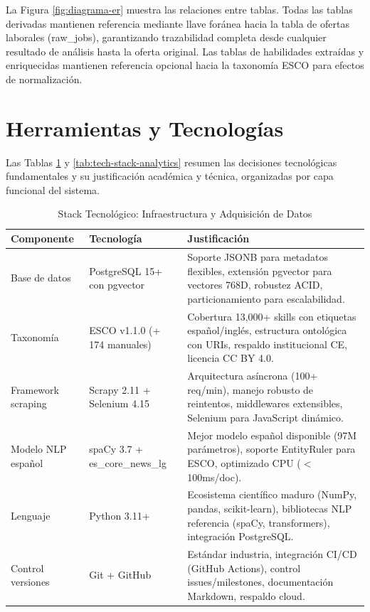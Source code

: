 La Figura \ref{fig:diagrama-er} muestra las relaciones entre tablas. Todas las tablas derivadas mantienen referencia mediante llave foránea hacia la tabla de ofertas laborales (raw\_jobs), garantizando trazabilidad completa desde cualquier resultado de análisis hasta la oferta original. Las tablas de habilidades extraídas y enriquecidas mantienen referencia opcional hacia la taxonomía ESCO para efectos de normalización.

\section{Herramientas y Tecnologías}

Las Tablas \ref{tab:tech-stack-infra} y \ref{tab:tech-stack-analytics} resumen las decisiones tecnológicas fundamentales y su justificación académica y técnica, organizadas por capa funcional del sistema.

\begin{table}[H]
\centering
\caption{Stack Tecnológico: Infraestructura y Adquisición de Datos}
\label{tab:tech-stack-infra}
\begin{tabular}{|p{3.5cm}|p{3.5cm}|p{6.5cm}|}
\hline
\textbf{Componente} & \textbf{Tecnología} & \textbf{Justificación} \\
\hline
Base de datos & PostgreSQL 15+ con pgvector & Soporte JSONB para metadatos flexibles, extensión pgvector para vectores 768D, robustez ACID, particionamiento para escalabilidad. \\
\hline
Taxonomía & ESCO v1.1.0 (+ 174 manuales) & Cobertura 13,000+ skills con etiquetas español/inglés, estructura ontológica con URIs, respaldo institucional CE, licencia CC BY 4.0. \\
\hline
Framework scraping & Scrapy 2.11 + Selenium 4.15 & Arquitectura asíncrona (100+ req/min), manejo robusto de reintentos, middlewares extensibles, Selenium para JavaScript dinámico. \\
\hline
Modelo NLP español & spaCy 3.7 + es\_core\_news\_lg & Mejor modelo español disponible (97M parámetros), soporte EntityRuler para ESCO, optimizado CPU ($<$100ms/doc). \\
\hline
Lenguaje & Python 3.11+ & Ecosistema científico maduro (NumPy, pandas, scikit-learn), bibliotecas NLP referencia (spaCy, transformers), integración PostgreSQL. \\
\hline
Control versiones & Git + GitHub & Estándar industria, integración CI/CD (GitHub Actions), control issues/milestones, documentación Markdown, respaldo cloud. \\
\hline
\end{tabular}
\end{table}

